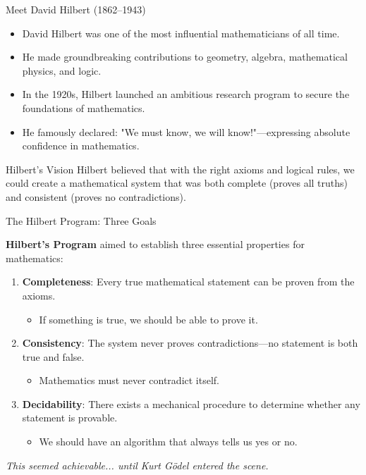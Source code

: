 \documentclass[aspectratio=169]{beamer}
\begin{document}
\begin{frame}{Meet David Hilbert (1862--1943)}

\begin{itemize}
    \item David Hilbert was one of the most influential mathematicians of all time.
    \item He made groundbreaking contributions to geometry, algebra, mathematical physics, and logic.
    \item In the 1920s, Hilbert launched an ambitious research program to secure the foundations of mathematics.
    \item He famously declared: "We must know, we will know!"—expressing absolute confidence in mathematics.
\end{itemize}

\begin{block}{Hilbert's Vision}
Hilbert believed that with the right axioms and logical rules, we could create a mathematical system that was both complete (proves all truths) and consistent (proves no contradictions).
\end{block}

\end{frame}

\begin{frame}{The Hilbert Program: Three Goals}

\textbf{Hilbert's Program} aimed to establish three essential properties for mathematics:

\begin{enumerate}
    \item \textbf{Completeness}: Every true mathematical statement can be proven from the axioms.
    \begin{itemize}
        \item If something is true, we should be able to prove it.
    \end{itemize}
    \item \textbf{Consistency}: The system never proves contradictions—no statement is both true and false.
    \begin{itemize}
        \item Mathematics must never contradict itself.
    \end{itemize}
    \item \textbf{Decidability}: There exists a mechanical procedure to determine whether any statement is provable.
    \begin{itemize}
        \item We should have an algorithm that always tells us yes or no.
    \end{itemize}
\end{enumerate}

\vspace{0.3cm}
\textit{This seemed achievable... until Kurt Gödel entered the scene.}

\end{frame}
\end{document}
